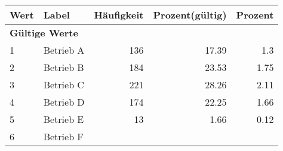      \begin{longtable}{lXrrr}
     \toprule
     \textbf{Wert} & \textbf{Label} & \textbf{Häufigkeit} & \textbf{Prozent(gültig)} & \textbf{Prozent} \\
     \endhead
     \midrule
     \multicolumn{5}{l}{\textbf{Gültige Werte}}\\

     1 &
     \multicolumn{1}{X}{ Betrieb A   } &


       \num{136} &
       \num[round-mode=places,round-precision=2]{17,39} &
         \num[round-mode=places,round-precision=2]{1,3} \\

     2 &
     \multicolumn{1}{X}{ Betrieb B   } &


       \num{184} &
       \num[round-mode=places,round-precision=2]{23,53} &
         \num[round-mode=places,round-precision=2]{1,75} \\

     3 &
     \multicolumn{1}{X}{ Betrieb C   } &


       \num{221} &
       \num[round-mode=places,round-precision=2]{28,26} &
         \num[round-mode=places,round-precision=2]{2,11} \\

     4 &
     \multicolumn{1}{X}{ Betrieb D   } &


       \num{174} &
       \num[round-mode=places,round-precision=2]{22,25} &
         \num[round-mode=places,round-precision=2]{1,66} \\

     5 &
     \multicolumn{1}{X}{ Betrieb E   } &


       \num{13} &
       \num[round-mode=places,round-precision=2]{1,66} &
         \num[round-mode=places,round-precision=2]{0,12} \\

     6 &
     \multicolumn{1}{X}{ Betrieb F   } &



\end{longtable}
